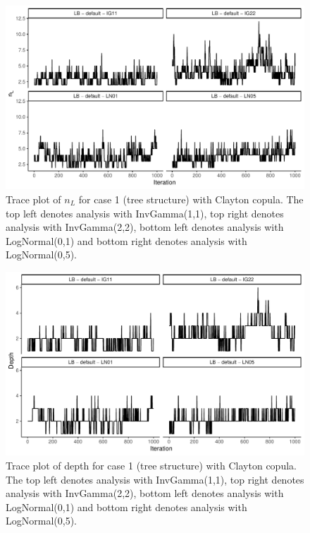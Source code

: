 \documentclass{amsart}
\begin{document}

\begin{figure}
	\centering
	\includegraphics[width = 0.75\linewidth]{trace_case1_clayton_nterm.pdf}
	\caption{Trace plot of $n_L$ for case 1 (tree structure) with Clayton copula. The top left denotes analysis with InvGamma(1,1), top right denotes analysis with InvGamma(2,2), bottom left denotes analysis with LogNormal(0,1) and bottom right denotes analysis with LogNormal(0,5).}
	\label{fig:case1:clayton:nterm}
\end{figure}

\begin{figure}
	\centering
	\includegraphics[width = 0.75\linewidth]{trace_case1_clayton_depth.pdf}
	\caption{Trace plot of depth for case 1 (tree structure) with Clayton copula. The top left denotes analysis with InvGamma(1,1), top right denotes analysis with InvGamma(2,2), bottom left denotes analysis with LogNormal(0,1) and bottom right denotes analysis with LogNormal(0,5).}
	\label{fig:case1:clayton:depth}
\end{figure}
\end{document}
